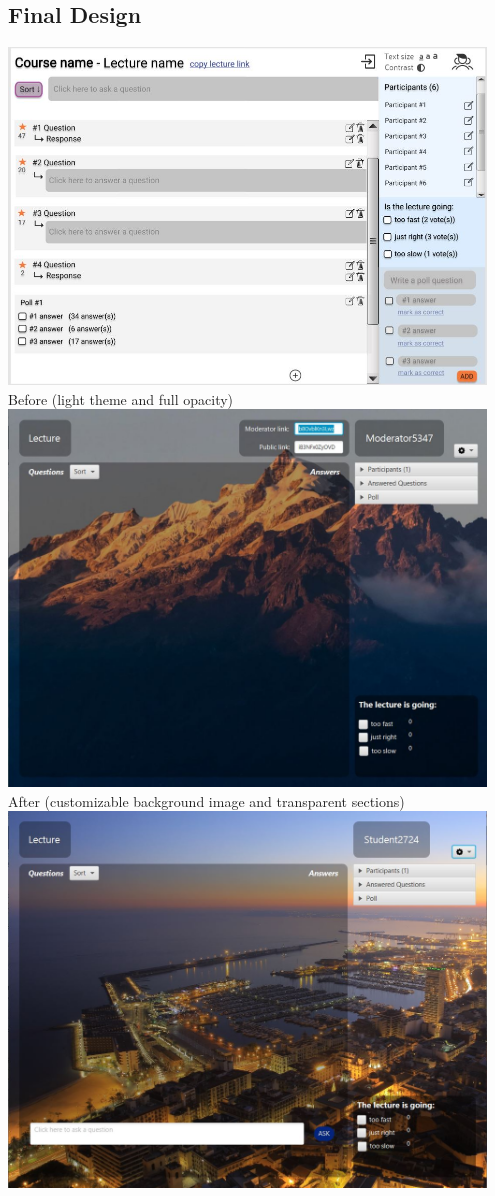 \documentclass{article}
\begin{document}
\subsection{Final Design}
\begin{center}
    \label{beforeafter}
    \includegraphics[width=0.95\textwidth]{initial_design.JPG}
    Before (light theme and full opacity)
    \vfill
    \includegraphics[width=0.95\textwidth]{moderator_screen.JPG}
    After (customizable background image and transparent sections)
    \clearpage
    \label{studentmoderator}
    \includegraphics[width=0.95\textwidth]{student_screen.JPG}

\end{center}
\end{document}
